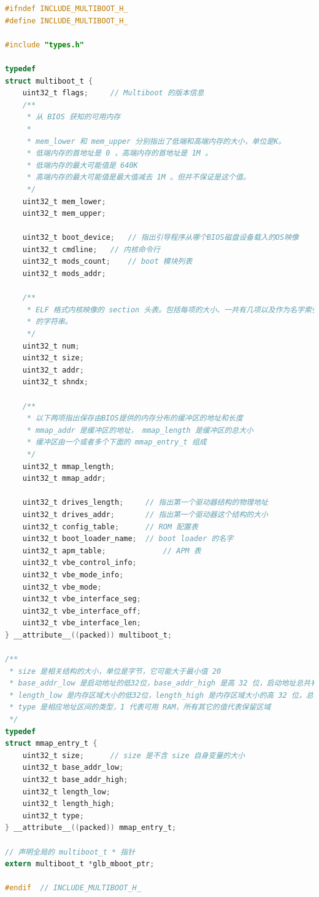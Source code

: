 \begin{lstlisting}[language = C, label = include/multiboot.h, caption = include/multiboot.h]
#ifndef INCLUDE_MULTIBOOT_H_
#define INCLUDE_MULTIBOOT_H_

#include "types.h"

typedef
struct multiboot_t {
	uint32_t flags;		// Multiboot 的版本信息
	/** 
	 * 从 BIOS 获知的可用内存
	 *
	 * mem_lower 和 mem_upper 分别指出了低端和高端内存的大小，单位是K。
	 * 低端内存的首地址是 0 ，高端内存的首地址是 1M 。
	 * 低端内存的最大可能值是 640K 
	 * 高端内存的最大可能值是最大值减去 1M 。但并不保证是这个值。
	 */
	uint32_t mem_lower;
	uint32_t mem_upper;

	uint32_t boot_device;	// 指出引导程序从哪个BIOS磁盘设备载入的OS映像
	uint32_t cmdline;	// 内核命令行
	uint32_t mods_count;	// boot 模块列表
	uint32_t mods_addr;
	
	/**
	 * ELF 格式内核映像的 section 头表。包括每项的大小、一共有几项以及作为名字索引
	 * 的字符串。
	 */
	uint32_t num;
	uint32_t size;
	uint32_t addr;
	uint32_t shndx;

	/**
	 * 以下两项指出保存由BIOS提供的内存分布的缓冲区的地址和长度
	 * mmap_addr 是缓冲区的地址， mmap_length 是缓冲区的总大小
	 * 缓冲区由一个或者多个下面的 mmap_entry_t 组成
	 */
	uint32_t mmap_length;		
	uint32_t mmap_addr;
	
	uint32_t drives_length; 	// 指出第一个驱动器结构的物理地址	
	uint32_t drives_addr; 		// 指出第一个驱动器这个结构的大小
	uint32_t config_table; 		// ROM 配置表
	uint32_t boot_loader_name; 	// boot loader 的名字
	uint32_t apm_table; 	    	// APM 表
	uint32_t vbe_control_info;
	uint32_t vbe_mode_info;
	uint32_t vbe_mode;
	uint32_t vbe_interface_seg;
	uint32_t vbe_interface_off;
	uint32_t vbe_interface_len;
} __attribute__((packed)) multiboot_t;

/**
 * size 是相关结构的大小，单位是字节，它可能大于最小值 20
 * base_addr_low 是启动地址的低32位，base_addr_high 是高 32 位，启动地址总共有 64 位
 * length_low 是内存区域大小的低32位，length_high 是内存区域大小的高 32 位，总共是 64 位
 * type 是相应地址区间的类型，1 代表可用 RAM，所有其它的值代表保留区域
 */
typedef
struct mmap_entry_t {
	uint32_t size; 		// size 是不含 size 自身变量的大小
	uint32_t base_addr_low;
	uint32_t base_addr_high;
	uint32_t length_low;
	uint32_t length_high;
	uint32_t type;
} __attribute__((packed)) mmap_entry_t;

// 声明全局的 multiboot_t * 指针
extern multiboot_t *glb_mboot_ptr;

#endif 	// INCLUDE_MULTIBOOT_H_
\end{lstlisting}

